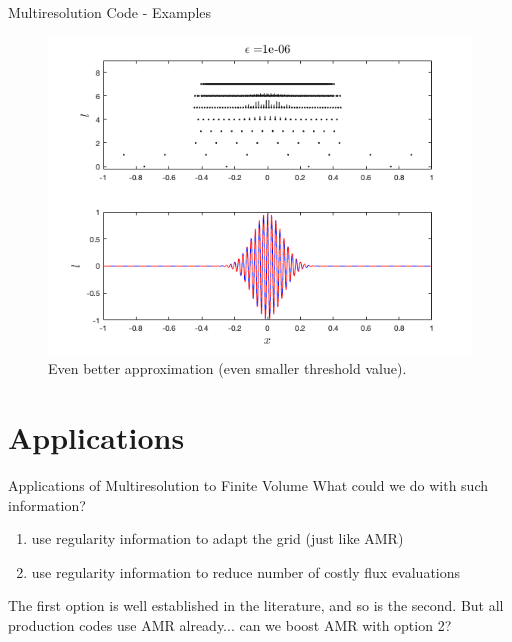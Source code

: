 \documentclass{beamer}
\begin{document}
\begin{frame}[shrink=15]{Multiresolution Code - Examples}
	\begin{figure}
		\center
		\includegraphics[scale=0.5]{plots/wiggle-hi.png}
		\caption{Even better approximation (even smaller threshold value).}
	\end{figure}	
\end{frame}


\section{Applications}
\begin{frame}[shrink=15]{Applications of Multiresolution to Finite Volume}
	What could we do with such information?
	\begin{enumerate}
		\item use regularity information to adapt the grid (just like AMR)
		\item use regularity information to reduce number of costly flux evaluations
	\end{enumerate}
	The first option is well established in the literature, and so is the second. But all production codes
	use AMR already... can we boost AMR with option 2? 
\end{frame}
\end{document}
